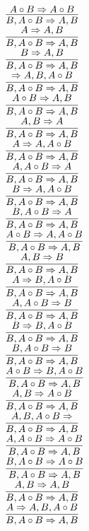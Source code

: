 \documentclass[11pt]{article}
\begin{document}
\begin{center}
\bigskip
\\$\infer{B, A\circ B\Rightarrow A, B}{A\circ B\Rightarrow A\circ B}$
\bigskip
\\$\infer{B, A\circ B\Rightarrow A, B}{A\Rightarrow A, B}$
\bigskip
\\$\infer{B, A\circ B\Rightarrow A, B}{B\Rightarrow A, B}$
\bigskip
\\$\infer{B, A\circ B\Rightarrow A, B}{\Rightarrow A, B, A\circ B}$
\bigskip
\\$\infer{B, A\circ B\Rightarrow A, B}{A\circ B\Rightarrow A, B}$
\bigskip
\\$\infer{B, A\circ B\Rightarrow A, B}{A, B\Rightarrow A}$
\bigskip
\\$\infer{B, A\circ B\Rightarrow A, B}{A\Rightarrow A, A\circ B}$
\bigskip
\\$\infer{B, A\circ B\Rightarrow A, B}{A, A\circ B\Rightarrow A}$
\bigskip
\\$\infer{B, A\circ B\Rightarrow A, B}{B\Rightarrow A, A\circ B}$
\bigskip
\\$\infer{B, A\circ B\Rightarrow A, B}{B, A\circ B\Rightarrow A}$
\bigskip
\\$\infer{B, A\circ B\Rightarrow A, B}{A\circ B\Rightarrow A, A\circ B}$
\bigskip
\\$\infer{B, A\circ B\Rightarrow A, B}{A, B\Rightarrow B}$
\bigskip
\\$\infer{B, A\circ B\Rightarrow A, B}{A\Rightarrow B, A\circ B}$
\bigskip
\\$\infer{B, A\circ B\Rightarrow A, B}{A, A\circ B\Rightarrow B}$
\bigskip
\\$\infer{B, A\circ B\Rightarrow A, B}{B\Rightarrow B, A\circ B}$
\bigskip
\\$\infer{B, A\circ B\Rightarrow A, B}{B, A\circ B\Rightarrow B}$
\bigskip
\\$\infer{B, A\circ B\Rightarrow A, B}{A\circ B\Rightarrow B, A\circ B}$
\bigskip
\\$\infer{B, A\circ B\Rightarrow A, B}{A, B\Rightarrow A\circ B}$
\bigskip
\\$\infer{B, A\circ B\Rightarrow A, B}{A, B, A\circ B\Rightarrow }$
\bigskip
\\$\infer{B, A\circ B\Rightarrow A, B}{A, A\circ B\Rightarrow A\circ B}$
\bigskip
\\$\infer{B, A\circ B\Rightarrow A, B}{B, A\circ B\Rightarrow A\circ B}$
\bigskip
\\$\infer{B, A\circ B\Rightarrow A, B}{A, B\Rightarrow A, B}$
\bigskip
\\$\infer{B, A\circ B\Rightarrow A, B}{A\Rightarrow A, B, A\circ B}$

\end{center}
\end{document}

